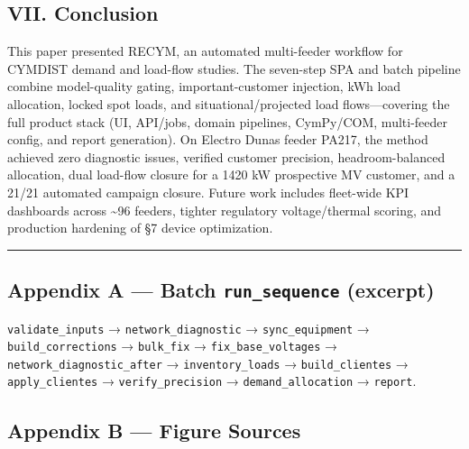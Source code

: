 \documentclass[
  11pt,
]{article}
\begin{document}
\subsection{VII. Conclusion}\label{vii.-conclusion}

This paper presented RECYM, an automated multi-feeder workflow for
CYMDIST demand and load-flow studies. The seven-step SPA and batch
pipeline combine model-quality gating, important-customer injection, kWh
load allocation, locked spot loads, and situational/projected load
flows—covering the full product stack (UI, API/jobs, domain pipelines,
CymPy/COM, multi-feeder config, and report generation). On Electro Dunas
feeder PA217, the method achieved zero diagnostic issues, verified
customer precision, headroom-balanced allocation, dual load-flow closure
for a 1420 kW prospective MV customer, and a 21/21 automated campaign
closure. Future work includes fleet-wide KPI dashboards across
\textasciitilde96 feeders, tighter regulatory voltage/thermal scoring,
and production hardening of §7 device optimization.

\begin{center}\rule{0.5\linewidth}{0.5pt}\end{center}

\subsection{\texorpdfstring{Appendix A — Batch \texttt{run\_sequence}
(excerpt)}{Appendix A — Batch run\_sequence (excerpt)}}\label{appendix-a-batch-run_sequence-excerpt}

\texttt{validate\_inputs} → \texttt{network\_diagnostic} →
\texttt{sync\_equipment} → \texttt{build\_corrections} →
\texttt{bulk\_fix} → \texttt{fix\_base\_voltages} →
\texttt{network\_diagnostic\_after} → \texttt{inventory\_loads} →
\texttt{build\_clientes} → \texttt{apply\_clientes} →
\texttt{verify\_precision} → \texttt{demand\_allocation} →
\texttt{report}.

\subsection{Appendix B — Figure
Sources}\label{appendix-b-figure-sources}
\end{document}
